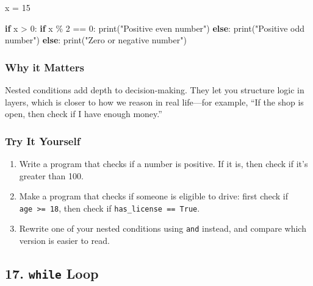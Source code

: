 \documentclass[
  letterpaper,
  DIV=11,
  numbers=noendperiod]{scrreprt}
\newenvironment{Shaded}{\begin{snugshade}}{\end{snugshade}}
\newcommand{\BuiltInTok}[1]{\textcolor[rgb]{0.00,0.23,0.31}{#1}}
\newcommand{\ControlFlowTok}[1]{\textcolor[rgb]{0.00,0.23,0.31}{\textbf{#1}}}
\newcommand{\DecValTok}[1]{\textcolor[rgb]{0.68,0.00,0.00}{#1}}
\newcommand{\NormalTok}[1]{\textcolor[rgb]{0.00,0.23,0.31}{#1}}
\newcommand{\OperatorTok}[1]{\textcolor[rgb]{0.37,0.37,0.37}{#1}}
\newcommand{\StringTok}[1]{\textcolor[rgb]{0.13,0.47,0.30}{#1}}
\providecommand{\tightlist}{%
  \setlength{\itemsep}{0pt}\setlength{\parskip}{0pt}}
\begin{document}
\begin{Shaded}
\begin{Highlighting}[]
\NormalTok{x }\OperatorTok{=} \DecValTok{15}

\ControlFlowTok{if}\NormalTok{ x }\OperatorTok{\textgreater{}} \DecValTok{0}\NormalTok{:}
    \ControlFlowTok{if}\NormalTok{ x }\OperatorTok{\%} \DecValTok{2} \OperatorTok{==} \DecValTok{0}\NormalTok{:}
        \BuiltInTok{print}\NormalTok{(}\StringTok{"Positive even number"}\NormalTok{)}
    \ControlFlowTok{else}\NormalTok{:}
        \BuiltInTok{print}\NormalTok{(}\StringTok{"Positive odd number"}\NormalTok{)}
\ControlFlowTok{else}\NormalTok{:}
    \BuiltInTok{print}\NormalTok{(}\StringTok{"Zero or negative number"}\NormalTok{)}
\end{Highlighting}
\end{Shaded}

\subsubsection{Why it Matters}\label{why-it-matters-16}

Nested conditions add depth to decision-making. They let you structure
logic in layers, which is closer to how we reason in real life---for
example, ``If the shop is open, then check if I have enough money.''

\subsubsection{Try It Yourself}\label{try-it-yourself-16}

\begin{enumerate}
\def\labelenumi{\arabic{enumi}.}
\tightlist
\item
  Write a program that checks if a number is positive. If it is, then
  check if it's greater than 100.
\item
  Make a program that checks if someone is eligible to drive: first
  check if \texttt{age\ \textgreater{}=\ 18}, then check if
  \texttt{has\_license\ ==\ True}.
\item
  Rewrite one of your nested conditions using \texttt{and} instead, and
  compare which version is easier to read.
\end{enumerate}

\subsection{\texorpdfstring{17. \texttt{while}
Loop}{17. while Loop}}\label{while-loop}
\end{document}

